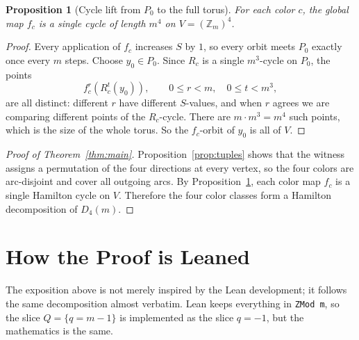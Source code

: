 \documentclass[11pt]{article}
\newtheorem{proposition}[theorem]{Proposition}
\newcommand{\Zm}{\mathbb Z_m}
\newcommand{\Pzero}{P_0}
\newcommand{\Qslice}{Q}
\begin{document}
\begin{proposition}[Cycle lift from $\Pzero$ to the full torus]\label{prop:lift-full}
For each color $c$, the global map $f_c$ is a single cycle of length $m^4$ on
$V=(\Zm)^4$.
\end{proposition}

\begin{proof}
Every application of $f_c$ increases $S$ by $1$, so every orbit meets $\Pzero$
exactly once every $m$ steps. Choose $y_0 \in \Pzero$. Since $R_c$ is a single
$m^3$-cycle on $\Pzero$, the points
\[
f_c^r(R_c^t(y_0)),
\qquad
0 \le r < m,\quad 0 \le t < m^3,
\]
are all distinct: different $r$ have different $S$-values, and when $r$ agrees we
are comparing different points of the $R_c$-cycle. There are
$m \cdot m^3 = m^4$ such points, which is the size of the whole torus. So the
$f_c$-orbit of $y_0$ is all of $V$.
\end{proof}

\begin{proof}[Proof of Theorem~\ref{thm:main}]
Proposition~\ref{prop:tuples} shows that the witness assigns a permutation of the
four directions at every vertex, so the four colors are arc-disjoint and cover all
outgoing arcs. By Proposition~\ref{prop:lift-full}, each color map $f_c$ is a
single Hamilton cycle on $V$. Therefore the four color classes form a Hamilton
decomposition of $D_4(m)$.
\end{proof}

\section{How the Proof is Leaned}\label{sec:lean}

The exposition above is not merely inspired by the Lean development; it follows
the same decomposition almost verbatim. Lean keeps everything in \texttt{ZMod m},
so the slice $\Qslice=\{q=m-1\}$ is implemented as the slice $q=-1$, but the
mathematics is the same.
\end{document}
